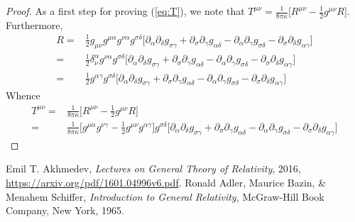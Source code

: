 \documentclass[]{article}
\begin{document}
\begin{proof}
	
	As a first step for proving (\ref{eq:T}), we note that $T^{\mu\nu}=\frac{1}{8\pi\kappa}\big[R^{\mu\nu}-\frac{1}{2}g^{\mu\nu}R\big]$. Furthermore,
	\begin{align*}
	R=&\frac{1}{2}g_{\mu\nu}g^{\mu\alpha}g^{\nu\alpha}g^{\sigma\delta}\big[\partial_{\alpha}\partial_{\delta}g_{\sigma\gamma} + \partial_{\sigma}\partial_{\gamma}g_{\alpha\delta} - \partial_{\alpha}\partial_{\gamma}g_{\sigma\delta} - \partial_{\sigma}\partial_{\delta}g_{\alpha\gamma}\big]\\
	=&\frac{1}{2}\delta^{\alpha}_{\nu}g^{\nu\alpha}g^{\sigma\delta}\big[\partial_{\alpha}\partial_{\delta}g_{\sigma\gamma} + \partial_{\sigma}\partial_{\gamma}g_{\alpha\delta} - \partial_{\alpha}\partial_{\gamma}g_{\sigma\delta} - \partial_{\sigma}\partial_{\delta}g_{\alpha\gamma}\big]\\
	=&\frac{1}{2}g^{\alpha\gamma}g^{\sigma\delta}\big[\partial_{\alpha}\partial_{\delta}g_{\sigma\gamma} + \partial_{\sigma}\partial_{\gamma}g_{\alpha\delta} - \partial_{\alpha}\partial_{\gamma}g_{\sigma\delta} - \partial_{\sigma}\partial_{\delta}g_{\alpha\gamma}\big]
	\end{align*}
	Whence
	\begin{align*}
	T^{\mu\nu}=&\frac{1}{8\pi\kappa}\big[R^{\mu\nu}-\frac{1}{2}g^{\mu\nu}R\big]\\
	=&\frac{1}{8\pi\kappa}\big[ g^{\mu\alpha}g^{\nu\gamma} - \frac{1}{2}g^{\mu\nu}g^{\alpha\gamma}  \big]g^{\sigma\delta}\big[\partial_{\alpha}\partial_{\delta}g_{\sigma\gamma} + \partial_{\sigma}\partial_{\gamma}g_{\alpha\delta} - \partial_{\alpha}\partial_{\gamma}g_{\sigma\delta} - \partial_{\sigma}\partial_{\delta}g_{\alpha\gamma}\big]
	\end{align*}
\end{proof}

\begin{thebibliography}{9}
	
	Emil T. Akhmedev,
	\emph{Lectures on General Theory of Relativity},
	2016,
	\url{https://arxiv.org/pdf/1601.04996v6.pdf}.
	Ronald Adler, Maurice Bazin, \& Menahem Schiffer,
	\emph{Introduction to General Relativity},
	McGraw-Hill Book Company, New York,
	1965.
	
	
\end{thebibliography}
\end{document}

